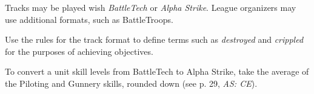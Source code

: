 Tracks may be played wish \emph{BattleTech} or \emph{Alpha Strike}.
League organizers may use additional formats, such as BattleTroops.

Use the rules for the track format to define terms such as \emph{destroyed} and \emph{crippled} for the purposes of achieving objectives.

To convert a unit skill levels from BattleTech to Alpha Strike, take the average of the Piloting and Gunnery skills, rounded down (see p. 29, \emph{AS: CE}).
